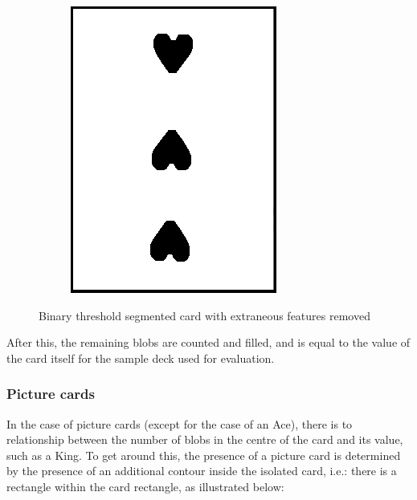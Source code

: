 \documentclass[a4paper,12pt,notitlepage]{article}
\begin{document}
\begin{figure}[H]
\begin{subfigure}[b]{0.4\textwidth}
					\caption{}
				\end{subfigure}
				\begin{subfigure}[b]{0.4\textwidth}
					\centering
					\includegraphics[width=\textwidth]{chris/image21}
					\caption{}
				\end{subfigure}
				\caption{Binary threshold segmented card with extraneous features removed}
				\label{fig:closing}
			\end{figure}

			After this, the remaining blobs are counted and filled, and is equal to the value of the card itself for the sample deck used for evaluation.

		\subsubsection{Picture cards}
			In the case of picture cards (except for the case of an Ace), there is to relationship between the number of blobs in the centre of the card and its value, such as a King. To get around this, the presence of a picture card is determined by the presence of an additional contour inside the isolated card, i.e.: there is a rectangle within the card rectangle, as illustrated below:
\end{document}
